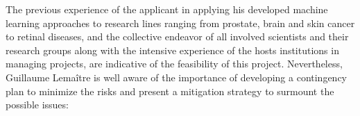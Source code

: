 The previous experience of the applicant in applying his developed machine learning approaches to research lines ranging from prostate, brain and skin cancer to retinal diseases, and the collective endeavor of all involved scientists and their research groups along with the intensive experience of the hosts institutions in managing projects, are indicative of the feasibility of this project. 
Nevertheless, Guillaume Lema\^itre is well aware of the importance of developing a contingency plan to minimize the risks and present a mitigation strategy to surmount the possible issues:
